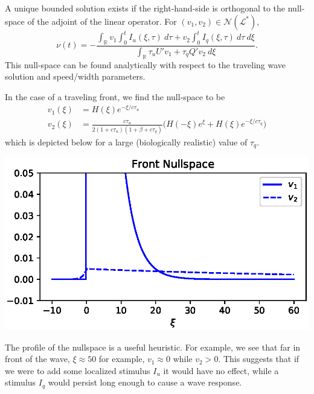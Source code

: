 \documentclass[landscape,final]{baposter}
\newcommand{\RR}{\mathbb{R}}
\newcommand{\LL}{\mathcal{L}}
\begin{document}
\begin{poster}
{	A unique bounded solution exists if the right-hand-side is orthogonal to the null-space of the adjoint of the linear operator. For $(v_1, v_2) \in \mathcal{N}(\LL^*)$, 
	\[
		\nu(t) = - \frac{\int_\RR v_1 \int_0^t I_u(\xi, \tau) \ d\tau + v_2 \int_0^t I_q(\xi, \tau) \ d\tau \ d\xi}{\int_\RR \tau_u U' v_1 + \tau_q Q' v_2 \ d\xi}.
	\]
	This null-space can be found analytically with respect to the traveling wave solution and speed/width parameters.
	\vspace{.2cm}
}

{
	In the case of a traveling front, we find the null-space to be
	\begin{align*}
		v_1(\xi) &= H(\xi) e^{-\xi/c\tau_u} \\
		v_2(\xi) &= \frac{c\tau_u}{2(1+c\tau_u)(1+\beta+c\tau_q)} \big( H(-\xi)e^{\xi} + H(\xi) e^{-\xi/c\tau_q} \big)
	\end{align*}
	which is depicted below for a large (biologically realistic) value of $\tau_q$.
	\begin{center}
		\includegraphics[width=.9\linewidth]{nullspace}
	\end{center}
	The profile of the nullspace is a useful heuristic. For example, we see that far in front of the wave, $\xi \approx 50$ for example, $v_1 \approx 0$ while $v_2 > 0$. This suggests that if we were to add some localized stimulus $I_u$ it would have no effect, while a stimulus $I_q$ would persist long enough to cause a wave response.
	\bigbreak
	
}
\end{poster}
\end{document}
